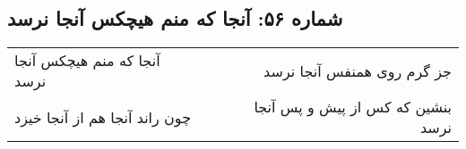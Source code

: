 \begin{center}
\section*{شماره ۵۶: آنجا که منم هیچکس آنجا نرسد}
\label{sec:056}
\begin{longtable}{l p{0.5cm} r}
آنجا که منم هیچکس آنجا نرسد
&&
جز گرم روی همنفس آنجا نرسد
\\
چون راند آنجا هم از آنجا خیزد
&&
بنشین که کس از پیش و پس آنجا نرسد
\\
\end{longtable}
\end{center}
